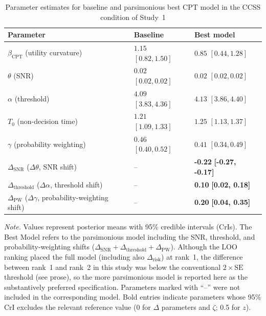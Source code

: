 \documentclass[man,floatsintext]{apa7}
\begin{document}
\begin{table}[!htbp]
\centering
\begin{threeparttable}\small
\caption{Parameter estimates for baseline and parsimonious best CPT model in the CCSS condition of Study~1}
\label{tab:cpt_pe_ccss_study1}
\begin{tabularx}{\linewidth}{@{} >{\raggedright\arraybackslash}p{6cm} >{\centering\arraybackslash}X >{\centering\arraybackslash}X @{}}
\toprule
\textbf{Parameter} & \textbf{Baseline} & \textbf{Best model} \\
\midrule
$\beta_{\text{CPT}}$ (utility curvature) & $1.15$ $[0.82, 1.50]$ & $0.85$ $[0.44, 1.28]$ \\
$\theta$ (SNR) & $0.02$ $[0.02, 0.02]$ & $0.02$ $[0.02, 0.02]$ \\
$\alpha$ (threshold) & $4.09$ $[3.83, 4.36]$ & $4.13$ $[3.86, 4.40]$ \\
$T_0$ (non-decision time) & $1.21$ $[1.09, 1.33]$ & $1.25$ $[1.13, 1.37]$ \\
$\gamma$ (probability weighting) & $0.46$ $[0.40, 0.52]$ & $0.41$ $[0.34, 0.49]$ \\
$\Delta_{\text{SNR}}$ ($\Delta\theta$, SNR shift) & -- & \textbf{-0.22} \textbf{[-0.27, -0.17]} \\
$\Delta_{\text{threshold}}$ ($\Delta\alpha$, threshold shift) & -- & \textbf{0.10} \textbf{[0.02, 0.18]} \\
$\Delta_{\text{PW}}$ ($\Delta\gamma$, probability-weighting shift) & -- & \textbf{0.20} \textbf{[0.04, 0.35]} \\
\bottomrule
\end{tabularx}
\begin{tablenotes}
\item \textit{Note.} Values represent posterior means with 95\% credible intervals (CrIs). The Best Model refers to the parsimonious model including the SNR, threshold, and probability-weighting shifts ($\Delta_{\text{SNR}}+\Delta_{\text{threshold}}+\Delta_{\text{PW}}$). Although the LOO ranking placed the full model (including also $\Delta_{\text{risk}}$) at rank~1, the difference between rank~1 and rank~2 in this study was below the conventional $2 \times \mathrm{SE}$ threshold (see prose), so the more parsimonious model is reported here as the substantively preferred specification. Parameters marked with ``--'' were not included in the corresponding model. Bold entries indicate parameters whose 95\% CrI excludes the relevant reference value (0 for $\Delta$ parameters and $\zeta$; 0.5 for $z$).
\end{tablenotes}
\end{threeparttable}
\end{table}
\end{document}
